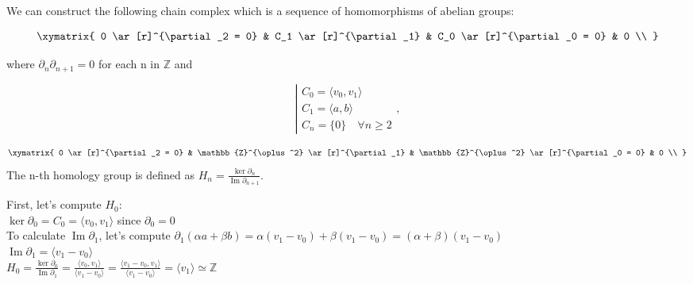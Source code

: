 \documentclass[11pt,a4paper]{report}
\DeclareMathOperator{\Ima}{Im}
\begin{document}
                       
                    We can construct the following chain complex which is a sequence of homomorphisms of abelian groups: 

	\[
		\xymatrix{
			0  \ar[r]^{\partial_2 = 0} & 
			C_1  \ar[r]^{\partial_1} & 
			C_0  \ar[r]^{\partial_0 = 0}
			& 0 \\ }
	\]

 where \(\partial_n\partial_{n+1}=0\) for each n  in $\mathbb{Z}$ and 
 
			\[
				\left|
				  \begin{array}{l}
				  	C_0= \langle v_0, v_1\rangle \\
				  	C_1=\langle a, b \rangle \\
                    C_n=\{0\} \quad \forall n \geqslant 2 
				  \end{array}
				\right., 
			\]

			\[
                \xymatrix{
                    0  \ar[r]^{\partial_2 = 0} & 
                    \mathbb{Z}^{\oplus^2}  \ar[r]^{\partial_1} & 
                    \mathbb{Z}^{\oplus^2}  \ar[r]^{\partial_0 = 0}
                    & 0 \\ }
	        \]
The n-th homology group is defined as $H_n = \frac{\ker\partial_n}{\Ima\partial_{n+1}}$. \\

\par
First, let's compute $H_0$: \\
$\ker\partial_0 = C_0 = \langle v_0, v_1 \rangle$ since $\partial_0 = 0$ \\ 
To calculate $\Ima\partial_1$, let's compute $\partial_1(\alpha a + \beta b) = \alpha (v_1-v_0) + \beta (v_1-v_0) = (\alpha + \beta)(v_1 - v_0)$  \\
$\Ima\partial_1 = \langle v_1 - v_0 \rangle$ \\
$H_0 = \frac{\ker\partial_0}{\Ima\partial_1} = \frac{ \langle v_0, v_1 \rangle  }{ \langle v_1-v_0 \rangle } = \frac{ \langle v_1-v_0, v_1 \rangle  }{ \langle v_1-v_0 \rangle }
                                                             =\langle v_1 \rangle  \simeq \mathbb{Z}$ \\
\end{document}
